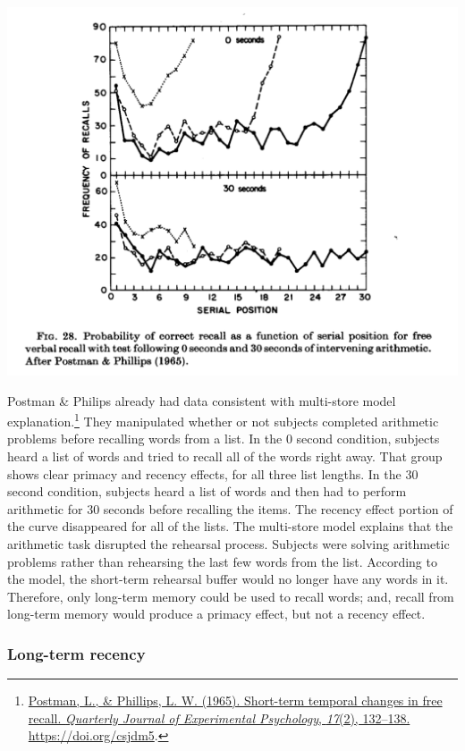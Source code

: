 \documentclass[
  oneside,
  12pt]{crumpbook}
\newenvironment{floatright50}{%
  \wrapfigure{R}{.5\textwidth}%
  }{%
  \endwrapfigure}
\begin{document}
\begin{floatright50}
\includegraphics[width=1\linewidth]{imgs/Serial_position_2}

\end{floatright50}

Postman \& Philips already had data consistent with multi-store model explanation.\footnote{\protect\hyperlink{ref-postmanShorttermTemporalChanges1965}{Postman, L., \& Phillips, L. W. (1965). Short-term temporal changes in free recall. \emph{Quarterly Journal of Experimental Psychology}, \emph{17}(2), 132--138. \url{https://doi.org/csjdm5}}.} They manipulated whether or not subjects completed arithmetic problems before recalling words from a list. In the 0 second condition, subjects heard a list of words and tried to recall all of the words right away. That group shows clear primacy and recency effects, for all three list lengths. In the 30 second condition, subjects heard a list of words and then had to perform arithmetic for 30 seconds before recalling the items. The recency effect portion of the curve disappeared for all of the lists. The multi-store model explains that the arithmetic task disrupted the rehearsal process. Subjects were solving arithmetic problems rather than rehearsing the last few words from the list. According to the model, the short-term rehearsal buffer would no longer have any words in it. Therefore, only long-term memory could be used to recall words; and, recall from long-term memory would produce a primacy effect, but not a recency effect.

\hypertarget{long-term-recency}{%
\subsubsection{Long-term recency}\label{long-term-recency}}
\end{document}
